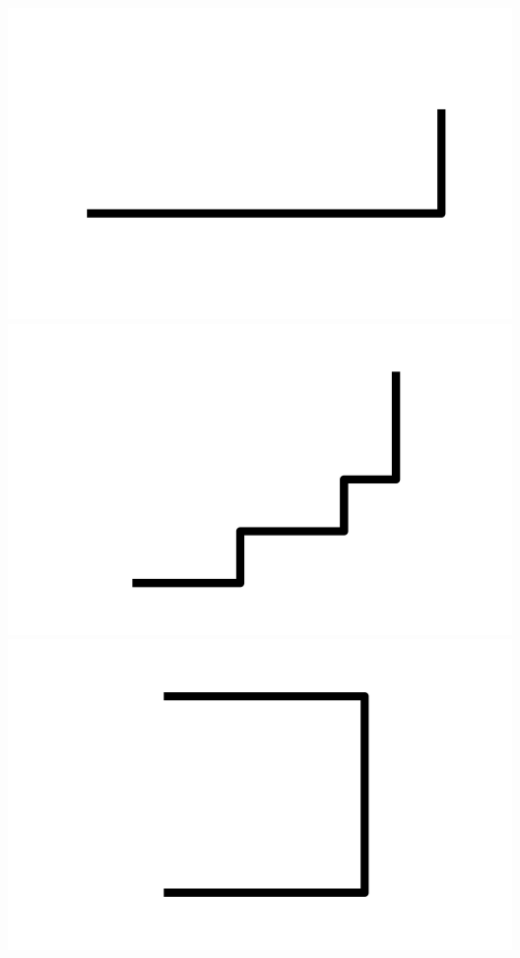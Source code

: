 \documentclass[]{report}
\begin{document}
\includegraphics[scale=.1]{pictures/21/state_cluster_shapes_148.pdf} 
\includegraphics[scale=.1]{pictures/21/state_cluster_shapes_149.pdf} 
\includegraphics[scale=.1]{pictures/21/state_cluster_shapes_150.pdf} 
\end{document}
